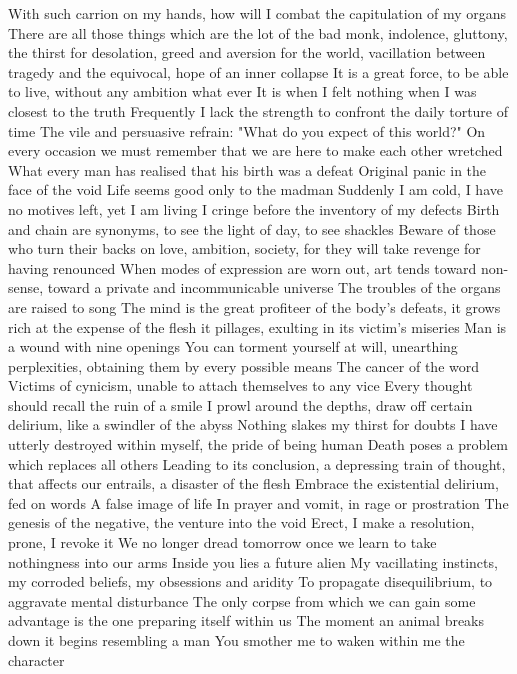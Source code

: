 \documentclass{article}
\begin{document}
With such carrion on my hands, how will I combat the capitulation of my organs
There are all those things which are the lot of the bad monk, indolence, gluttony, the thirst for desolation, greed and aversion for the world, vacillation between tragedy and the equivocal, hope of an inner collapse
It is a great force, to be able to live, without any ambition what ever
It is when I felt nothing when I was closest to the truth
Frequently I lack the strength to confront the daily torture of time
The vile and persuasive refrain: "What do you expect of this world?"
On every occasion we must remember that we are here to make each other wretched
What every man has realised that his birth was a defeat
Original panic in the face of the void
Life seems good only to the madman
Suddenly I am cold, I have no motives left, yet I am living
I cringe before the inventory of my defects
Birth and chain are synonyms, to see the light of day, to see shackles
Beware of those who turn their backs on love, ambition, society, for they will take revenge for having renounced
When modes of expression are worn out, art tends toward non-sense, toward a private and incommunicable universe
The troubles of the organs are raised to song
The mind is the great profiteer of the body's defeats, it grows rich at the expense of the flesh it pillages, exulting in its victim's miseries
Man is a wound with nine openings
You can torment yourself at will, unearthing perplexities, obtaining them by every possible means
The cancer of the word
Victims of cynicism, unable to attach themselves to any vice
Every thought should recall the ruin of a smile
I prowl around the depths, draw off certain delirium, like a swindler of the abyss
Nothing slakes my thirst for doubts
I have utterly destroyed within myself, the pride of being human
Death poses a problem which replaces all others
Leading to its conclusion, a depressing train of thought, that affects our entrails, a disaster of the flesh
Embrace the existential delirium, fed on words
A false image of life
In prayer and vomit, in rage or prostration
The genesis of the negative, the venture into the void
Erect, I make a resolution, prone, I revoke it
We no longer dread tomorrow once we learn to take nothingness into our arms
Inside you lies a future alien
My vacillating instincts, my corroded beliefs, my obsessions and aridity
To propagate disequilibrium, to aggravate mental disturbance
The only corpse from which we can gain some advantage is the one preparing itself within us
The moment an animal breaks down it begins resembling a man
You smother me to waken within me the character
\end{document}

